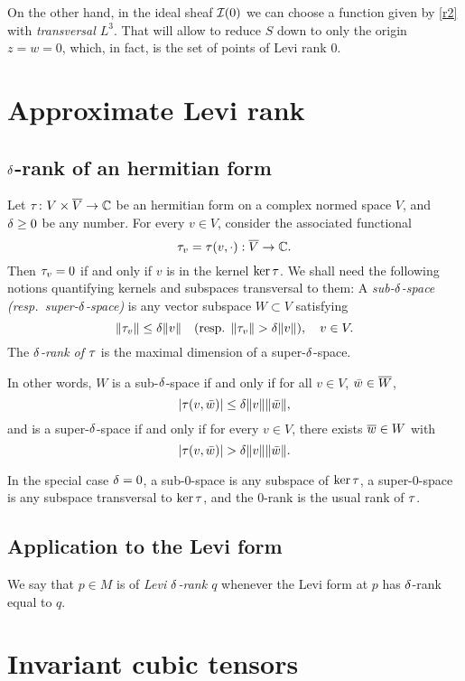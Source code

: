 \documentclass[12pt]{amsart}
\begin{document}
On the other hand, 
in the ideal sheaf ${\mathcal{I}}(0)$
we can choose a function given by \eqref{r2}
with {\em transversal $L^3$}.
That will allow to reduce $S$ down to only the origin 
$z=w=0$,
which, in fact, is the set of points of Levi rank $0$.
\ee



\section{Approximate Levi rank}
\subsection{$\delta$-rank of an hermitian form}
Let $\tau\colon V\times \overline{V}\to {\mathbb{C}}$ be an hermitian form
on a complex normed space $V$,
and $\delta\ge 0$ be any number.
For every $v\in V$, consider the associated functional
$$
	\tau_v=\tau(v, \cdot) : \overline{V} \to {\mathbb{C}}.
$$
Then $\tau_v=0$ if and only if $v$ is in the kernel $\ker\tau$.
We shall need the following notions quantifying
kernels and subspaces transversal to them:
\bd
	A {\em sub-$\delta$-space (resp.\ super-$\delta$-space)}
	is any vector subspace $W\subset V$ satisfying
	$$
		\|\tau_v\| \le \delta \|v\| 
		\quad
		(\text{resp. } \|\tau_v\| > \delta \|v\|),
		\quad
		v\in V.
	$$
	The {\em $\delta$-rank of $\tau$} is the maximal dimension of a
	super-$\delta$-space.
\ed

In other words, $W$ is a sub-$\delta$-space if and only if
for all $v\in V$, ${\bar w}\in \overline{W}$,
$$
	|\tau(v,{\bar w})| \le \delta \|v\| \|{\bar w}\|,
$$
and is a super-$\delta$-space if and only if
for every $v\in V$, there exists $\overline{w}\in W$ with
$$
	 |\tau(v,{\bar w})| > \delta \|v\| \|{\bar w}\|.
$$


\br
In the special case $\delta=0$,
a sub-$0$-space is any subspace of $\ker\tau$,
a super-$0$-space is any subspace transversal to $\ker\tau$,
and the $0$-rank is the usual rank of $\tau$.
\er





\subsection{Application to the Levi form}

\bd
We say that $p\in M$ is of {\em Levi $\delta$-rank $q$}
whenever the Levi form at $p$ has $\delta$-rank equal to $q$.
\ed



\section{Invariant cubic tensors}
\end{document}
